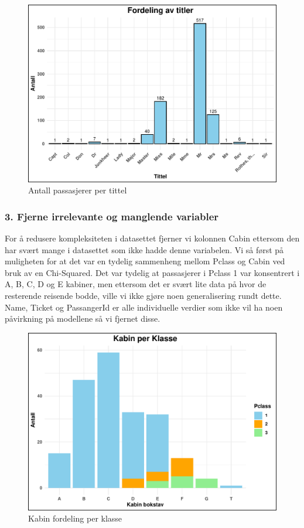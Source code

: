 \documentclass[
]{article}
\begin{document}
\begin{figure}[H]

{\centering \includegraphics[width=0.8\linewidth]{presentation_files/figure-latex/unnamed-chunk-6-1} 

}

\caption{Antall passasjerer per tittel}\label{fig:unnamed-chunk-6}
\end{figure}

\subsubsection{3. Fjerne irrelevante og manglende
variabler}\label{fjerne-irrelevante-og-manglende-variabler}

For å redusere kompleksiteten i datasettet fjerner vi kolonnen Cabin
ettersom den har svært mange i datasettet som ikke hadde denne
variabelen. Vi så først på muligheten for at det var en tydelig
sammenheng mellom Pclass og Cabin ved bruk av en Chi-Squared. Det var
tydelig at passasjerer i Pclass 1 var konsentrert i A, B, C, D og E
kabiner, men ettersom det er svært lite data på hvor de resterende
reisende bodde, ville vi ikke gjøre noen generalisering rundt dette.
Name, Ticket og PassangerId er alle individuelle verdier som ikke vil ha
noen påvirkning på modellene så vi fjernet disse.

\begin{figure}[H]

{\centering \includegraphics[width=0.8\linewidth]{presentation_files/figure-latex/unnamed-chunk-7-1} 

}

\caption{Kabin fordeling per klasse}\label{fig:unnamed-chunk-7}
\end{figure}
\end{document}
